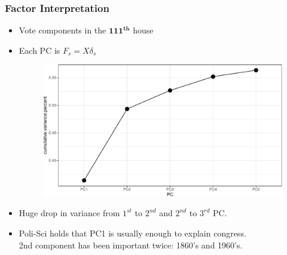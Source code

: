 \documentclass[
  shownotes,
  xcolor={svgnames},
  hyperref={colorlinks,citecolor=DarkBlue,linkcolor=DarkRed,urlcolor=DarkBlue}
  , aspectratio=169]{beamer}
\newcommand{\sg}{\color{DarkSlateGray}}
\newcommand{\bs}[1]{\boldsymbol{#1}}
\begin{document}
\begin{frame}[fragile]
\frametitle{Factor Interpretation}



\begin{itemize}

  \item Vote components in the $\bs{111^{th}}$ house
 
 \item Each PC is $F_s = X\delta_s$ 

  \begin{figure}[H] \centering
            \captionsetup{justification=centering}
              \includegraphics[scale=0.4]{figures/scree_plot}
              
 \end{figure}

\item Huge drop in variance from $1^{st}$ to $2^{nd}$ and  $2^{nd}$ to $3^{rd}$ PC.
\item Poli-Sci holds that PC1 is usually enough to explain congress. \\\sg 2nd component has been important twice: 1860's and 1960's.

\end{itemize}

\end{frame}
\end{document}
